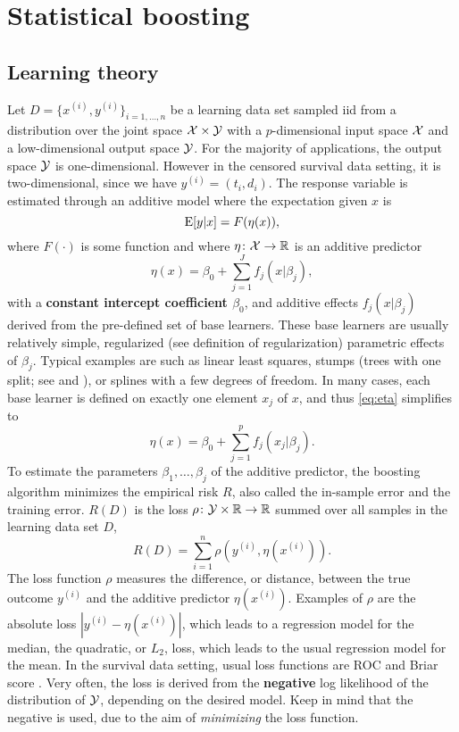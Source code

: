 \chapter{Statistical boosting}

\section{Learning theory}
Let $D=\{x^{(i)},y^{(i)}\}_{i=1,\ldots,n}$ be a learning data set sampled iid from a distribution over the joint space $\mathcal{X}\times\mathcal{Y}$ with a $p$-dimensional input space $\mathcal{X}$ and a low-dimensional output space $\mathcal{Y}$. For the majority of applications, the output space $\mathcal{Y}$ is one-dimensional. However in the censored survival data setting, it is two-dimensional, since we have $y^{(i)}=(t_i,d_i)$. The response variable is estimated through an additive model where the expectation given $x$ is 
\begin{equation}
    \operatorname{E}[y|x]=F(\eta(x)),
\end{equation}
where $F(\cdot)$ is some function and where $\eta\colon\mathcal{X}\to\mathbb{R}$ is an additive predictor
\begin{equation}\label{eq:eta}
    \eta(x)=\beta_0+\sum_{j=1}^Jf_j(x|\beta_j),
\end{equation}
with a \textbf{constant intercept coefficient $\beta_0$}, and additive effects $f_j(x|\beta_j)$ derived from the pre-defined set of base learners.
These base learners are usually relatively simple, regularized (see definition of regularization) parametric effects of $\beta_j$. Typical examples are such as linear least squares, stumps (trees with one split; see \citet{buhlmann2007} and \citet{ESL}), or splines with a few degrees of freedom. In many cases, each base learner is defined on exactly one element $x_j$ of $x$, and thus \eqref{eq:eta} simplifies to
\begin{equation}\label{eq:eta-componentwise}
    \eta(x)=\beta_0+\sum_{j=1}^pf_j(x_j|\beta_j).
\end{equation}
To estimate the parameters $\beta_1,\ldots,\beta_j$ of the additive predictor, the boosting algorithm minimizes the empirical risk $R$, also called the in-sample error and the training error. $R(D)$ is the loss $\rho\colon\mathcal{Y}\times\mathbb{R}\to\mathbb{R}$ summed over all samples in the learning data set $D$,
\begin{equation}
    R(D)=\sum_{i=1}^n\rho(y^{(i)},\eta(x^{(i)})).
\end{equation}
The loss function $\rho$ measures the difference, or distance, between the true outcome $y^{(i)}$ and the additive predictor $\eta(x^{(i)})$. Examples of $\rho$ are the absolute loss $|y^{(i)}-\eta(x^{(i)})|$, which leads to a regression model for the median, the quadratic, or $L_2$, loss, which leads to the usual regression model for the mean. In the survival data setting, usual loss functions are ROC and Briar score \citep{bovelstadborgan}. Very often, the loss is derived from the \textbf{negative} log likelihood of the distribution of $\mathcal{Y}$, depending on the desired model. Keep in mind that the negative is used, due to the aim of \textit{minimizing} the loss function.
